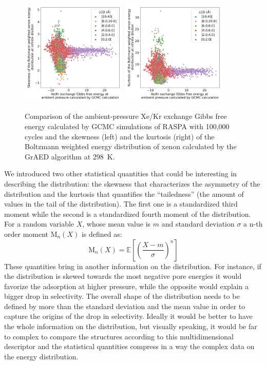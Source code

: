 \documentclass[main]{subfiles}
\begin{document}
\begin{figure}[ht]
  \centering
    \includegraphics[width=0.45\textwidth]{figures/3-fastsim/G_2080_vs_enthalpy_skew_overview.jpg}
    \includegraphics[width=0.45\textwidth]{figures/3-fastsim/G_2080_vs_enthalpy_kurt_overview.jpg}
    \caption{Comparison of the ambient-pressure Xe/Kr exchange Gibbs free energy calculated by GCMC simulations of RASPA with 100,000 cycles and the skewness (left) and the kurtosis (right) of the Boltzmann weighted energy distribution of xenon calculated by the GrAED algorithm at \SI{298}{\kelvin}.}\label{fgr:enthalpy_skew_kurt}
\end{figure}

We introduced two other statistical quantities that could be interesting in describing the distribution: the skewness that characterizes the asymmetry of the distribution and the kurtosis that quantifies the ``tailedness'' (the amount of values in the tail of the distribution). The first one is a standardized third moment while the second is a standardized fourth moment of the distribution. For a random variable $X$, whose mean value is $m$ and standard deviation $\sigma$ a n-th order moment $\text{M}_{n}(X)$ is defined as:
\begin{equation}
  \text{M}_n(X) = \mathbb{E}\left[\left(\dfrac{X-m}{\sigma}\right)^n\right]
\end{equation}
These quantities bring in another information on the distribution. For instance, if the distribution is skewed towards the most negative pore energies it would favorize the adsorption at higher pressure, while the opposite would explain a bigger drop in selectivity. The overall shape of the distribution needs to be defined by more than the standard deviation and the mean value in order to capture the origins of the drop in selectivity. Ideally it would be better to have the whole information on the distribution, but visually speaking, it would be far to complex to compare the structures according to this multidimensional descriptor and the statistical quantities compress in a way the complex data on the energy distribution.
\end{document}
